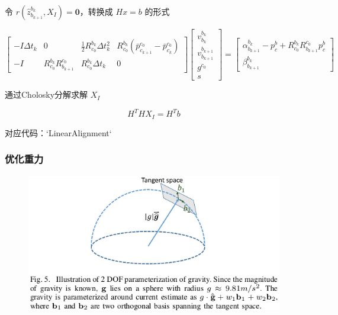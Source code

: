 \documentclass[12pt,a4paper]{article}
\begin{document}
令 $r(\hat{z}_{b_{k+1}}^{b_{k}}, X_I)=\mathbf{0}$，转换成 $Hx=b$ 的形式

\begin{equation}
\begin{bmatrix}
-I\Delta t_{k} & 0 & \frac{1}{2}R^{b_{k}}_{c_{0}} \Delta t_{k}^{2} &
R^{b_{k}}_{c_{0}}(\bar{p}^{c_{0}}_{c_{k+1}}-\bar{p}^{c_{0}}_{c_{k}}) \\
-I & R^{b_{k}}_{c_{0}} R^{c_0}_{b_{k+1}} & R^{b_{k}}_{c_{0}}\Delta t_{k} & 0
\end{bmatrix}
\begin{bmatrix}
v^{b_{k}}_{b_{k}}\\
v^{b_{k+1}}_{b_{k+1}}\\
g^{c_{0}}\\
s
\end{bmatrix} =
\begin{bmatrix}
\alpha^{b_{k}}_{b_{k+1}} - p_c^b + R^{b_{k}}_{c_{0}} R^{c_0}_{b_{k+1}} p_c^b \\
\beta ^{b_{k}}_{b_{k+1}}
\end{bmatrix}
\end{equation}

通过Cholosky分解求解 $X_I$

\begin{equation}
H^T H X_I = H^T b
\end{equation}

对应代码：`LinearAlignment`

\subsubsection{优化重力}

\begin{figure}[htbp]
\centering
\includegraphics[scale=0.6]{images/gravity_tangent_space.png}
\end{figure}
\end{document}
